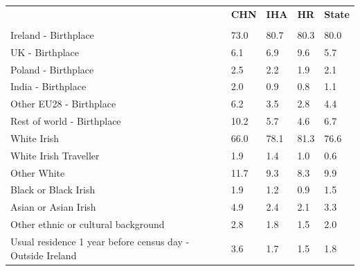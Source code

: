 \documentclass{article}
\begin{document}
\pagebreak
\begin{table}[h]	
\centering
		\begin{tabular}{KTTTT}
  \hline
& \textbf{CHN} & \textbf{IHA} & \textbf{HR}& \textbf{State}\\ 
  \hline
    \\ 
    \hline
Ireland - Birthplace & 73.0& 80.7& 80.3& 80.0\\
UK - Birthplace & 6.1& 6.9& 9.6& 5.7\\
Poland - Birthplace & 2.5& 2.2& 1.9& 2.1\\
India - Birthplace & 2.0& 0.9& 0.8& 1.1\\
Other EU28 - Birthplace & 6.2& 3.5& 2.8& 4.4\\
Rest of world - Birthplace & 10.2&  5.7&  4.6&  6.7\\
    \hline
White Irish & 66.0& 78.1& 81.3& 76.6\\
White Irish Traveller & 1.9& 1.4& 1.0& 0.6\\
Other White & 11.7&  9.3&  8.3&  9.9\\
Black or Black Irish & 1.9& 1.2& 0.9& 1.5\\
Asian or Asian Irish & 4.9& 2.4& 2.1& 3.3\\
Other ethnic or cultural background & 2.8& 1.8& 1.5& 2.0\\
    \hline
Usual residence 1 year before census day - Outside Ireland & 3.6& 1.7& 1.5& 1.8\\


\end{tabular}
\end{table}
\end{document}
